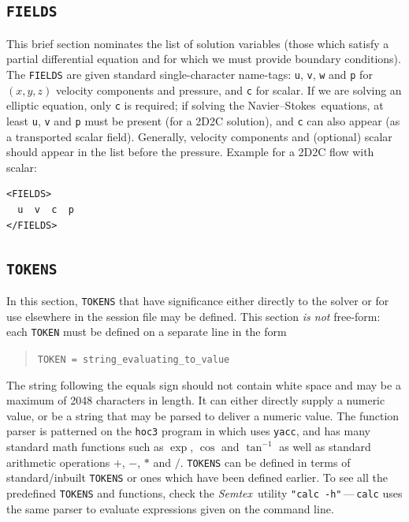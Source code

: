 \documentclass[11pt]{report}
\newcommand{\Semtex}{\emph{Semtex}} \newcommand{\Dog}{\emph{Dog}}
\newcommand\NavSto{Navier--Stokes}
\begin{document}
\subsection{\texttt{FIELDS}}
\label{sec.fields}


This brief section nominates the list of solution variables (\ie those
which satisfy a partial differential equation and for which we must
provide boundary conditions).  The \verb|FIELDS| are given standard
single-character name-tags: \verb|u|, \verb|v|, \verb|w| and \verb|p|
for $(x,y,z)$ velocity components and pressure, and \verb|c| for
scalar.  If we are solving an elliptic equation, only \verb|c| is
required; if solving the \NavSto\ equations, at least \verb|u|,
\verb|v| and \verb|p| must be present (for a 2D2C solution), and
\verb|c| can also appear (as a transported scalar field).  Generally,
velocity components and (optional) scalar should appear in the list
before the pressure. Example for a 2D2C flow with scalar:
%
{\small
\begin{verbatim}
<FIELDS>
  u  v  c  p
</FIELDS>
\end{verbatim}
}

\subsection{\texttt{TOKENS}}
\label{sec.tokens}

In this section, \verb|TOKENS| that have significance either directly
to the solver or for use elsewhere in the session file may be defined.
This section \emph{is not} free-form: each \verb|TOKEN| must be
defined on a separate line in the form
\begin{quote}
  \verb|TOKEN = string_evaluating_to_value|
\end{quote}
The string following the equals sign should not contain white space
and may be a maximum of 2048 characters in length.  It can either
directly supply a numeric value, or be a string that may be parsed to
deliver a numeric value.  The function parser is patterned on the
\verb|hoc3| program in \citet{kernighan84} which uses \verb|yacc|, and
has many standard math functions such as $\exp$, $\cos$ and
$\tan^{-1}$ as well as standard arithmetic operations $+$, $-$, $\ast$
and $/$.  \verb|TOKENS| can be defined in terms of standard/inbuilt
\verb|TOKENS| or ones which have been defined earlier.  To see all the
predefined \verb|TOKENS| and functions, check the \Semtex\ utility
\verb|"calc -h"|\,---\,\verb|calc| uses the same parser to evaluate
expressions given on the command line.
\end{document}
